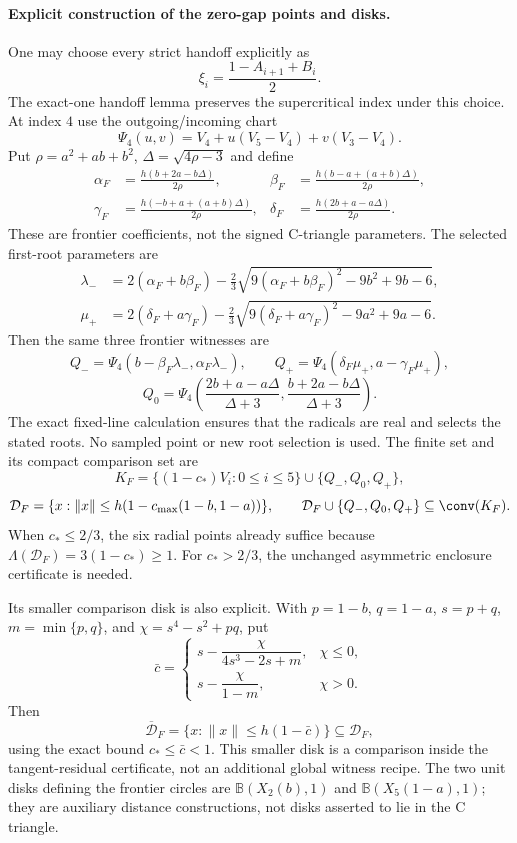 \paragraph{Explicit construction of the zero-gap points and disks.}
One may choose every strict handoff explicitly as
\[
 \xi_i=\frac{1-A_{i+1}+B_i}{2}.
\]
The exact-one handoff lemma preserves the supercritical index under this
choice. At index $4$ use the outgoing/incoming chart
\[
 \Psi_4(u,v)=V_4+u(V_5-V_4)+v(V_3-V_4).
\]
Put $\rho=a^2+ab+b^2$, $\Delta=\sqrt{4\rho-3}$ and define
\begin{align*}
 \alpha_F&=\frac{h(b+2a-b\Delta)}{2\rho},&
 \beta_F&=\frac{h(b-a+(a+b)\Delta)}{2\rho},\\
 \gamma_F&=\frac{h(-b+a+(a+b)\Delta)}{2\rho},&
 \delta_F&=\frac{h(2b+a-a\Delta)}{2\rho}.
\end{align*}
These are frontier coefficients, not the signed C-triangle parameters.
The selected first-root parameters are
\begin{align*}
 \lambda_-&=2(\alpha_F+b\beta_F)
 -\frac23\sqrt{9(\alpha_F+b\beta_F)^2-9b^2+9b-6},\\
 \mu_+&=2(\delta_F+a\gamma_F)
 -\frac23\sqrt{9(\delta_F+a\gamma_F)^2-9a^2+9a-6}.
\end{align*}
Then the same three frontier witnesses are
\[
 Q_-=\Psi_4(b-\beta_F\lambda_-,\alpha_F\lambda_-),
 \qquad Q_+=\Psi_4(\delta_F\mu_+,a-\gamma_F\mu_+),
\]
\[
 Q_0=\Psi_4\left(
 \frac{2b+a-a\Delta}{\Delta+3},
 \frac{b+2a-b\Delta}{\Delta+3}\right).
\]
The exact fixed-line calculation ensures that the radicals are real and
selects the stated roots. No sampled point or new root selection is used.
The finite set and its compact comparison set are
\[
 K_F=\{(1-c_*)V_i:0\le i\le5\}\cup\{Q_-,Q_0,Q_+\},
\]
\[
 \mathcal D_F=\{x:\|x\|\le h(1-c_{\max}(1-b,1-a))\},
 \qquad \mathcal D_F\cup\{Q_-,Q_0,Q_+\}\subseteq\conv(K_F).
\]
When $c_*\le2/3$, the six radial points already suffice because
$\Lambda(\mathcal D_F)=3(1-c_*)\ge1$. For $c_*>2/3$, the unchanged
asymmetric enclosure certificate is needed.

Its smaller comparison disk is also explicit. With $p=1-b$, $q=1-a$,
$s=p+q$, $m=\min\{p,q\}$, and
$\chi=s^4-s^2+pq$, put
\[
 \bar c=\begin{cases}
 s-\dfrac{\chi}{4s^3-2s+m},&\chi\le0,\\[2mm]
 s-\dfrac{\chi}{1-m},&\chi>0.
 \end{cases}
\]
Then
\[
 \overline{\mathcal D}_F=\{x:\|x\|\le h(1-\bar c)\}
 \subseteq\mathcal D_F,
\]
using the exact bound $c_*\le\bar c<1$. This smaller disk is a
comparison inside the tangent-residual certificate, not an additional
global witness recipe. The two unit disks defining the frontier circles
are $\mathbb B(X_2(b),1)$ and $\mathbb B(X_5(1-a),1)$; they are auxiliary
distance constructions, not disks asserted to lie in the C triangle.
